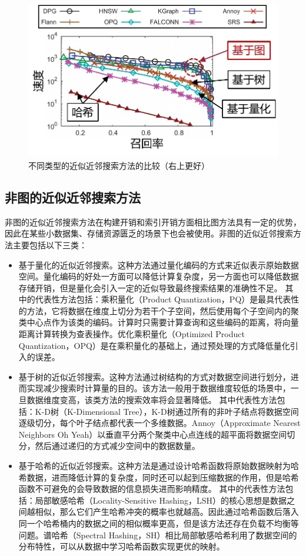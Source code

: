 \begin{figure}
  \centering
  \includegraphics[width=0.7\linewidth]{figures/Introduction/ganns-vs-other.pdf}
  \caption{不同类型的近似近邻搜索方法的比较\cite{dpg-2019}（右上更好）}
  \label{fig:ganns-vs-other}
\end{figure}


\subsection{非图的近似近邻搜索方法}
非图的近似近邻搜索方法在构建开销和索引开销方面相比图方法具有一定的优势，因此在某些小数据集、存储资源匮乏的场景下也会被使用。非图的近似近邻搜索方法主要包括以下三类：
\begin{itemize}
  \item 基于量化的近似近邻搜索。这种方法通过量化编码的方式来近似表示原始数据空间。量化编码的好处一方面可以降低计算复杂度，另一方面也可以降低数据存储开销，但是量化会引入一定的近似导致最终搜索结果的准确性不足。
  其中的代表性方法包括：乘积量化\cite{pq-2010}（Product Quantization，PQ）是最具代表性的方法，它将数据在维度上切分为若干个子空间，然后使用每个子空间内的聚类中心点作为该类的编码。计算时只需要计算查询和这些编码的距离，将向量距离计算转换为查表操作。优化乘积量化\cite{opq-2013}（Optimized Product Quantization，OPQ）是在乘积量化的基础上，通过预处理的方式降低量化引入的误差。

  \item 基于树的近似近邻搜索。这种方法通过树结构的方式对数据空间进行划分，进而实现减少搜索时计算量的目的。该方法一般用于数据维度较低的场景中，一旦数据维度变高，该类方法的搜索效率将会显著降低\cite{AQA-1998}。
  其中代表性方法包括：K-D树\cite{kdtree-2008}（K-Dimensional Tree），K-D树通过所有的非叶子结点将数据空间逐级切分，每个叶子结点都代表一个多维数据。Annoy\cite{Annoy}（Approximate Nearest Neighbors Oh Yeah）以垂直平分两个聚类中心点连线的超平面将数据空间切分，然后通过递归的方式减少空间中的数据数量。

  \item 基于哈希的近似近邻搜索。这种方法是通过设计哈希函数将原始数据映射为哈希数据，进而降低计算的复杂度，同时还可以起到压缩数据的作用，但是哈希函数不可避免的会导致数据的信息损失进而影响精度。
  其中的代表性方法包括：局部敏感哈希\cite{lsh-1999,lsh-2004}（Locality-Sensitive Hashing，LSH）的核心思想是数据之间越相似，那么它们产生哈希冲突的概率也就越高。因此通过哈希函数后落入同一个哈希桶内的数据之间的相似概率更高，但是该方法还存在负载不均衡等问题。谱哈希\cite{sh-2008}（Spectral Hashing，SH）相比局部敏感哈希利用了数据空间的分布特性，可以从数据中学习哈希函数实现更优的映射。
\end{itemize}


